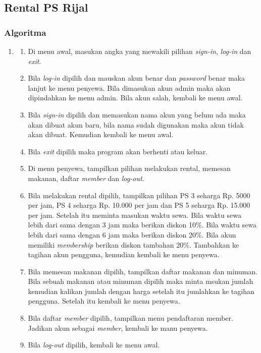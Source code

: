 \documentclass[../main.tex]{subfiles}
\begin{document}
    \subsection{Rental PS Rijal}
    \subsubsection{Algoritma}
    \begin{enumerate}
        \item[]
        \begin{enumerate}
            \item Di menu awal, masukan angka yang mewakili pilihan \textit{sign-in}, \textit{log-in} dan \textit{exit}.
            \item {Bila \textit{log-in} dipilih dan mauskan akun benar dan \textit{password} benar maka lanjut ke menu penyewa. Bila dimasukan akun admin maka akan dipindahkan ke menu admin. Bila akun salah, kembali ke menu awal.}
            \item {Bila \textit{sign-in} dipilih dan memasukan nama akun yang belum ada maka akan dibuat akun baru, bila nama sudah digunakan maka akun tidak akan dibuat. Kemudian kembali ke menu awal.}
            \item{Bila \textit{exit} dipilih maka program akan berhenti atau keluar.}
            \item{Di menu penyewa, tampilkan pilihan melakukan rental, memesan makanan, daftar \textit{member} dan \textit{log-out}.}
            \item{Bila melakukan rental dipilih, tampilkan pilihan PS 3 seharga Rp. 5000 per jam, PS 4 seharga Rp. 10.000 per jam dan PS 5 seharga Rp. 15.000 per jam. Setelah itu meminta masukan waktu sewa. Bila waktu sewa lebih dari sama dengan 3 jam maka berikan diskon 10\%. Bila waktu sewa lebih dari sama dengan 6 jam maka berikan diskon 20\%. Bila akun memiliki \textit{membership} berikan diskon tambahan 20\%. Tambahkan ke tagihan akun pengguna, kemudian kembali ke menu penyewa.}
            \item{Bila memesan makanan dipilih, tampilkan daftar makanan dan minuman. Bila sebuah makanan atau minuman dipilih maka minta msukan jumlah kemudian kalikan jumlah dengan harga setelah itu jumlahkan ke tagihan pengguna. Setelah itu kembali ke menu penyewa.}
            \item{Bila daftar \textit{member} dipilih, tampilkan menu pendaftaran member. Jadikan akun sebagai \textit{member}, kembali ke manu penyewa.}
            \item{Bila \textit{log-out} dipilih, kembali ke menu awal.}

\end{enumerate}
\end{enumerate}
\end{document}
